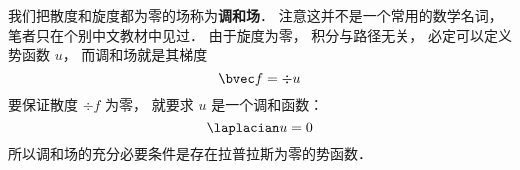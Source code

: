 
\begin{issues}
\issueDraft
\end{issues}

我们把散度和旋度都为零的场称为\textbf{调和场}． 注意这并不是一个常用的数学名词， 笔者只在个别中文教材中见过． 由于旋度为零， 积分与路径无关， 必定可以定义势函数 $u$， 而调和场就是其梯度
\begin{equation}
\bvec f = \div u
\end{equation}
要保证散度 $\div f$ 为零， 就要求 $u$ 是一个调和函数：
\begin{equation}
\laplacian u = 0
\end{equation}
所以调和场的充分必要条件是存在拉普拉斯为零的势函数．
